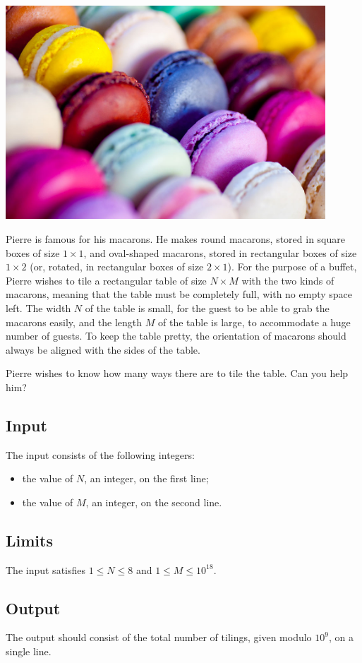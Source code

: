 
{\centering
  \includegraphics[width=.6\linewidth,height=8cm]{macarons.jpg}
\par}

\medskip

\noindent
Pierre is famous for his macarons. He makes round macarons, stored in 
square boxes of size $1\times 1$, and oval-shaped macarons, stored in
rectangular boxes of size $1\times 2$ (or, rotated, in rectangular
boxes of size
$2\times 1$). For the
purpose of a buffet, Pierre wishes to tile a rectangular table of size
$N\times M$ with the two kinds of macarons, meaning that the table must
be completely full, with no empty space left. The width $N$ of the table is
small, for the guest to be able to grab the macarons easily, and the
length $M$ of the table is large, to accommodate a huge number of guests.
To keep the table pretty, the orientation of macarons should always be aligned
with the sides of the table.

Pierre wishes to know how many ways there are to tile the table. Can you
help him?

\subsection*{Input}

The input consists of the following integers:
\begin{itemize}
\item the value of $N$, an integer, on the first line;
\item the value of $M$, an integer, on the second line.
\end{itemize}

\subsection*{Limits}

The input satisfies $1 \leq N \leq 8$ and
$1 \leq M \leq 10^{18}$.

\subsection*{Output}

The output should consist of the total number of tilings, given modulo
$10^9$, on a single line.

\clearpage

